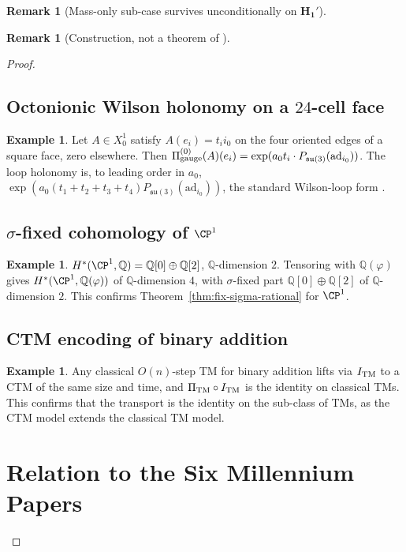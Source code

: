 \documentclass[11pt, a4paper]{amsart}
\theoremstyle{definition}
\newtheorem{remark}[theorem]{Remark}
\newtheorem{example}[theorem]{Example}
\newcommand{\Q}{\mathbb{Q}}
\newcommand{\pphi}{\varphi}
\newcommand{\gge}{{\rm gauge}}
\newcommand{\TM}{{\rm TM}}
\begin{document}
\begin{remark}[Mass-only sub-case survives unconditionally on $\mathbf{H_1'}$]
\begin{remark}[Construction, not a theorem of \cite{CascadeEmbeddings}]
\begin{proof}
\subsection{Octonionic Wilson holonomy on a $24$-cell face}

\begin{example}
\label{ex:octo-holonomy}
Let $A \in X_0^1$ satisfy $A(e_i) = t_i i_0$ on the four oriented
edges of a square face, zero elsewhere. Then
$\Pi_{\gge}^{(0)}(A)(e_i) = \exp(a_0 t_i \cdot
P_{\mathfrak{su}(3)}(\mathrm{ad}_{i_0}))$. The loop holonomy is, to
leading order in $a_0$, $\exp(a_0(t_1+t_2+t_3+t_4)
P_{\mathfrak{su}(3)}(\mathrm{ad}_{i_0}))$, the standard Wilson-loop
form \cite{WilsonLatticeGauge}.
\end{example}

\subsection{$\sigma$-fixed cohomology of $\CP^1$}

\begin{example}
\label{ex:cp1-sigma}
$H^*(\CP^1, \Q) = \Q[0]\oplus\Q[2]$, $\Q$-dimension $2$.
Tensoring with $\Q(\pphi)$ gives $H^*(\CP^1, \Q(\pphi))$ of
$\Q$-dimension $4$, with $\sigma$-fixed part
$\Q[0]\oplus\Q[2]$ of $\Q$-dimension $2$. This confirms
Theorem~\ref{thm:fix-sigma-rational} for $\CP^1$.
\end{example}

\subsection{CTM encoding of binary addition}

\begin{example}
\label{ex:ctm-add}
Any classical $O(n)$-step TM for binary addition lifts via
$I_{\TM}$ to a CTM of the same size and time, and
$\Pi_{\TM} \circ I_{\TM}$ is the identity on classical TMs. This
confirms that the transport is the identity on the sub-class of
TMs, as the CTM model extends the classical TM model.
\end{example}

\section{Relation to the Six Millennium Papers}
\label{sec:handoff}


\end{proof}
\end{remark}
\end{remark}
\end{document}
